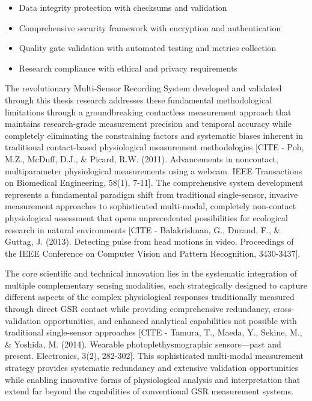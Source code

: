 \documentclass[12pt,a4paper]{report}
\begin{document}
\begin{itemize}
\item Data integrity protection with checksums and validation
\item Comprehensive security framework with encryption and authentication
\item Quality gate validation with automated testing and metrics collection
\item Research compliance with ethical and privacy requirements

\end{itemize}
The revolutionary Multi-Sensor Recording System developed and validated through this thesis research addresses these
fundamental methodological limitations through a groundbreaking contactless measurement approach that maintains
research-grade measurement precision and temporal accuracy while completely eliminating the constraining factors and
systematic biases inherent in traditional contact-based physiological measurement
methodologies [CITE - Poh, M.Z., McDuff, D.J., \& Picard, R.W. (2011). Advancements in noncontact, multiparameter physiological measurements using a webcam. IEEE Transactions on Biomedical Engineering, 58(1), 7-11].
The comprehensive system development represents a fundamental paradigm shift from traditional single-sensor, invasive
measurement approaches to sophisticated multi-modal, completely non-contact physiological assessment that opens
unprecedented possibilities for ecological research in natural
environments [CITE - Balakrishnan, G., Durand, F., \& Guttag, J. (2013). Detecting pulse from head motions in video. Proceedings of the IEEE Conference on Computer Vision and Pattern Recognition, 3430-3437].

The core scientific and technical innovation lies in the systematic integration of multiple complementary sensing
modalities, each strategically designed to capture different aspects of the complex physiological responses
traditionally measured through direct GSR contact while providing comprehensive redundancy, cross-validation
opportunities, and enhanced analytical capabilities not possible with traditional single-sensor
approaches [CITE - Tamura, T., Maeda, Y., Sekine, M., \& Yoshida, M. (2014). Wearable photoplethysmographic sensors—past and present. Electronics, 3(2), 282-302].
This sophisticated multi-modal measurement strategy provides systematic redundancy and extensive validation
opportunities while enabling innovative forms of physiological analysis and interpretation that extend far beyond the
capabilities of conventional GSR measurement systems.
\end{document}
